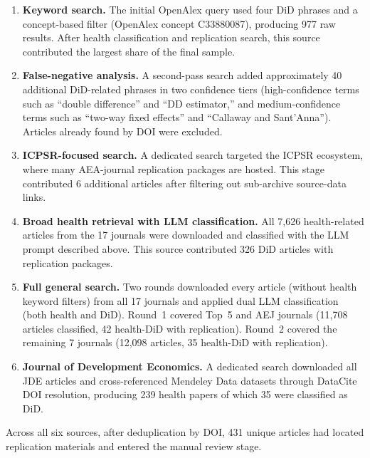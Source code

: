 \begin{enumerate}
  \item \textbf{Keyword search.} The initial OpenAlex query used four DiD phrases and a concept-based filter (OpenAlex concept C33880087), producing 977 raw results. After health classification and replication search, this source contributed the largest share of the final sample.

  \item \textbf{False-negative analysis.} A second-pass search added approximately 40 additional DiD-related phrases in two confidence tiers (high-confidence terms such as ``double difference'' and ``DD estimator,'' and medium-confidence terms such as ``two-way fixed effects'' and ``Callaway and Sant'Anna''). Articles already found by DOI were excluded.

  \item \textbf{ICPSR-focused search.} A dedicated search targeted the ICPSR ecosystem, where many AEA-journal replication packages are hosted. This stage contributed 6 additional articles after filtering out sub-archive source-data links.

  \item \textbf{Broad health retrieval with LLM classification.} All 7,626 health-related articles from the 17 journals were downloaded and classified with the LLM prompt described above. This source contributed 326 DiD articles with replication packages.

  \item \textbf{Full general search.} Two rounds downloaded every article (without health keyword filters) from all 17 journals and applied dual LLM classification (both health and DiD). Round~1 covered Top~5 and AEJ journals (11,708 articles classified, 42 health-DiD with replication). Round~2 covered the remaining 7 journals (12,098 articles, 35 health-DiD with replication).

  \item \textbf{Journal of Development Economics.} A dedicated search downloaded all JDE articles and cross-referenced Mendeley Data datasets through DataCite DOI resolution, producing 239 health papers of which 35 were classified as DiD.
\end{enumerate}

Across all six sources, after deduplication by DOI, 431 unique articles had located replication materials and entered the manual review stage.


